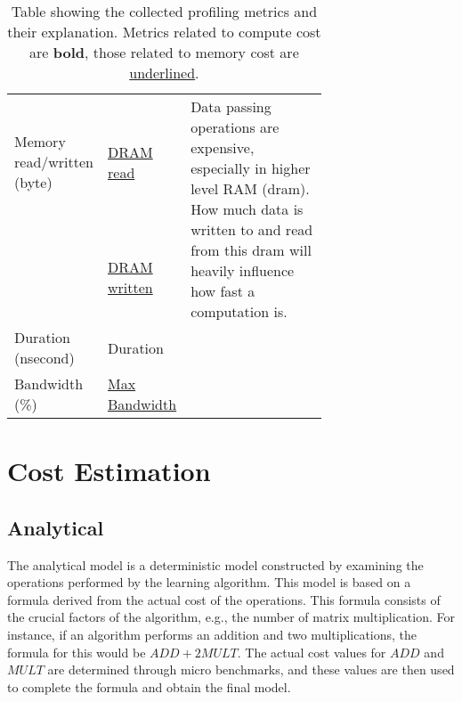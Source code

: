 \begin{table}[ht]
\begin{tabular}{@{}p{0.2\linewidth}lp{0.50\linewidth}@{}}
        \rule{0pt}{3ex}Memory read/written (byte)                & \underline{DRAM read}     & \multirow{2}{\linewidth}{Data passing operations are expensive, especially in higher level RAM (dram). How much data is written to and read from this dram will heavily influence how fast a computation is.} \\
                                                                 & \underline{DRAM written}  &                                                                                                                                                                                                               \\
        \rule{0pt}{3ex}Duration (nsecond)                        & Duration                  &                                                                                                                                                                                                               \\
        \rule{0pt}{3ex}Bandwidth (\%)                            & \underline{Max Bandwidth} &                                                                                                                                                                                                               \\ \bottomrule
    \end{tabular}

    \caption{Table showing the collected profiling metrics and their explanation. Metrics related to compute cost are \textbf{bold}, those related to memory cost are \underline{underlined}.
    }
    \label{tab:4-profiling-metrics}
\end{table}


\section{Cost Estimation}
\label{sec:4-cost-estimation}

\subsection{Analytical}
The analytical model is a deterministic model constructed by examining the operations performed by the learning algorithm. This model is based on a formula derived from the actual cost of the operations. This formula consists of the crucial factors of the algorithm, e.g., the number of matrix multiplication. For instance, if an algorithm performs an addition and two multiplications, the formula for this would be $ADD + 2MULT$. The actual cost values for $ADD$ and $MULT$ are determined through micro benchmarks, and these values are then used to complete the formula and obtain the final model.

